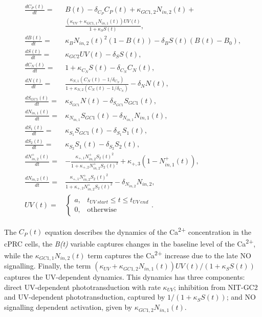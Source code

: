 \documentclass[
  11pt,
  letterpaper,
  DIV=11,
  numbers=noendperiod]{scrartcl}
\begin{document}
\begin{equation}\label{eq:wild-type-model}
\begin{aligned}
\frac{dC_P(t)}{dt} = & B(t) - \delta_{C_P} C_P(t) + \kappa_{GC1,2} N_{in,2}(t) + \\ & \frac{(\kappa_{UV} + \kappa_{GC1,1} N_{in,1}(t))UV(t)}{1+\kappa_S S(t)},\\
\frac{dB(t)}{dt} =& \kappa_{B} N_{in,2}(t)^2 (1-B(t)) - \delta_{B} S(t) (B(t)-B_0),\\
\frac{dS(t)}{dt} =& \kappa_{GC2} UV(t) - \delta_S S(t), \\
\frac{dC_N(t)}{dt} =&  1 + \kappa_{C_N} S(t) - \delta_{C_N} C_N(t),\\
\frac{dN(t)}{dt} =&  \frac{\kappa_{N,1} (C_N(t) - 1/\delta_{C_N})}{1 + \kappa_{N,2}(C_N(t) - 1/\delta_{C_N})} - \delta_N N(t), \\
\frac{dS_{GC1}(t)}{dt} =& \kappa_{S_{GC1}} N(t) - \delta_{S_{GC1}} S_{GC1}(t), \\
\frac{dN_{in,1}(t)}{dt} =& \kappa_{N_{in,1}} S_{GC1}(t) - \delta_{N_{in,1}} N_{in,1}(t),\\
\frac{dS_1(t)}{dt} =& \kappa_{S_1} S_{GC1}(t) - \delta_{S_1} S_1(t), \\
\frac{dS_2(t)}{dt} =& \kappa_{S_2} S_1(t) - \delta_{S_2} S_2(t), \\
\frac{dN_{in,2}^{+}(t)}{dt} =& -\frac{\kappa_{+,1} N_{in,2}^{+} S_2(t)^2}{1+\kappa_{+,2} N_{in,2}^{+} S_2(t)^2} + \kappa_{+,3} (1 - N_{in,1}^{+}(t)), \\
\frac{dN_{in,2}(t)}{dt} =& \frac{\kappa_{+,1} N_{in,2}^{+} S_2(t)^2}{1+\kappa_{+,2} N_{in,2}^{+} S_2(t)^2}  - \delta_{N_{in,2}} N_{in,2}, \\
UV(t) =&
    \begin{cases}
        a, & t_{UV\: start} \leq t \leq t_{UV\: end}\\
        0, & \text{otherwise}
    \end{cases}.
\end{aligned}
\end{equation}

The \(C_{P}(t)\) equation describes the dynamics of the
Ca\textsuperscript{2+} concentration in the cPRC cells, the \emph{B(t)}
variable captures changes in the baseline level of the
Ca\textsuperscript{2+}, while the \(\kappa_{GC1,1} N_{in,2}(t)\) term
captures the Ca\textsuperscript{2+} increase due to the late NO
signalling. Finally, the term
\((\kappa_{UV} + \kappa_{GC1,2} N_{in,1}(t))UV(t)/(1+\kappa_S S(t))\)
captures the UV-dependent dynamics. This dynamics has three components:
direct UV-dependent phototransduction with rate \(\kappa_{UV}\);
inhibition from NIT-GC2 and UV-dependent phototransduction, captured by
\(1/(1+\kappa_S S(t))\); and NO signalling dependent activation, given
by \(\kappa_{GC1,2} N_{in,1}(t)\).
\end{document}
